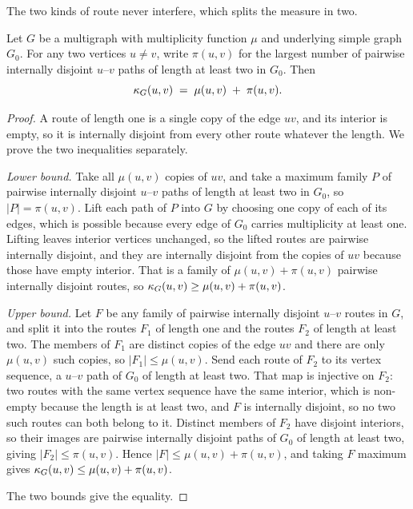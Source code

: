The two kinds of route never interfere, which splits the measure in two.

\begin{lemma}\label{lem:multi-vertex-split}
Let $G$ be a multigraph with multiplicity function $\mu$ and underlying simple graph $G_0$. For any two vertices $u \ne v$, write $\pi(u,v)$ for the largest number of pairwise internally disjoint $u$--$v$ paths of length at least two in $G_0$. Then
\[
    \kappa_G(u,v) \;=\; \mu(u,v) \;+\; \pi(u,v).
\]
\end{lemma}

\begin{proof}
A route of length one is a single copy of the edge $uv$, and its interior is empty, so it is internally disjoint from every other route whatever the length. We prove the two inequalities separately.

\emph{Lower bound.} Take all $\mu(u,v)$ copies of $uv$, and take a maximum family $P$ of pairwise internally disjoint $u$--$v$ paths of length at least two in $G_0$, so $|P| = \pi(u,v)$. Lift each path of $P$ into $G$ by choosing one copy of each of its edges, which is possible because every edge of $G_0$ carries multiplicity at least one. Lifting leaves interior vertices unchanged, so the lifted routes are pairwise internally disjoint, and they are internally disjoint from the copies of $uv$ because those have empty interior. That is a family of $\mu(u,v) + \pi(u,v)$ pairwise internally disjoint routes, so $\kappa_G(u,v) \ge \mu(u,v) + \pi(u,v)$.

\emph{Upper bound.} Let $F$ be any family of pairwise internally disjoint $u$--$v$ routes in $G$, and split it into the routes $F_1$ of length one and the routes $F_2$ of length at least two. The members of $F_1$ are distinct copies of the edge $uv$ and there are only $\mu(u,v)$ such copies, so $|F_1| \le \mu(u,v)$. Send each route of $F_2$ to its vertex sequence, a $u$--$v$ path of $G_0$ of length at least two. That map is injective on $F_2$: two routes with the same vertex sequence have the same interior, which is non-empty because the length is at least two, and $F$ is internally disjoint, so no two such routes can both belong to it. Distinct members of $F_2$ have disjoint interiors, so their images are pairwise internally disjoint paths of $G_0$ of length at least two, giving $|F_2| \le \pi(u,v)$. Hence $|F| \le \mu(u,v) + \pi(u,v)$, and taking $F$ maximum gives $\kappa_G(u,v) \le \mu(u,v) + \pi(u,v)$.

The two bounds give the equality.
\end{proof}

